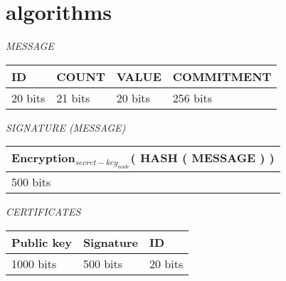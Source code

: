 \chapter{algorithms}

	\textit{MESSAGE}
	\newline
	
	\begin{tabular}{ | l | l | l | l |}
		\hline
		ID & COUNT & VALUE & COMMITMENT \\
		\hline
		20 bits & 21 bits & 20 bits & 256 bits\\
		\hline
	\end{tabular}
	\newline
	\newline
	\textit{SIGNATURE (MESSAGE)}
	\newline

	\begin{tabular}{ |l| }
		\hline
		Encryption$_{secret-key_{node}}$( HASH ( MESSAGE ) )\\
		\hline
		500 bits\\
		\hline
	\end{tabular}
	\newline
	\newline
	\textit{CERTIFICATES}
	\newline

	\begin{tabular}{ | l | l | l | }
		\hline
			Public key  & Signature & ID \\
		\hline
			1000 bits & 500 bits & 20 bits \\
		\hline

	\end{tabular}

	\newpage

